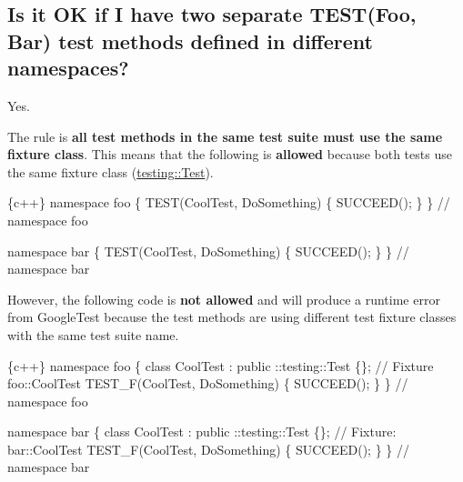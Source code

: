 \subsection*{Is it OK if I have two separate {\ttfamily T\+E\+S\+T(\+Foo, Bar)} test methods defined in different namespaces?}

Yes.

The rule is {\bfseries all test methods in the same test suite must use the same fixture class}. This means that the following is {\bfseries allowed} because both tests use the same fixture class ({\ttfamily \mbox{\hyperlink{classtesting_1_1Test}{testing\+::\+Test}}}).


\begin{DoxyCode}
\{c++\}
namespace foo \{
TEST(CoolTest, DoSomething) \{
  SUCCEED();
\}
\}  // namespace foo

namespace bar \{
TEST(CoolTest, DoSomething) \{
  SUCCEED();
\}
\}  // namespace bar
\end{DoxyCode}


However, the following code is {\bfseries not allowed} and will produce a runtime error from Google\+Test because the test methods are using different test fixture classes with the same test suite name.


\begin{DoxyCode}
\{c++\}
namespace foo \{
class CoolTest : public ::testing::Test \{\};  // Fixture foo::CoolTest
TEST\_F(CoolTest, DoSomething) \{
  SUCCEED();
\}
\}  // namespace foo

namespace bar \{
class CoolTest : public ::testing::Test \{\};  // Fixture: bar::CoolTest
TEST\_F(CoolTest, DoSomething) \{
  SUCCEED();
\}
\}  // namespace bar
\end{DoxyCode}
 